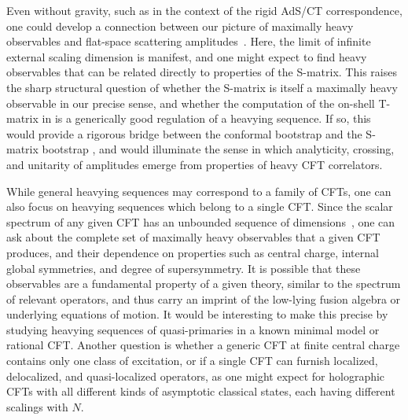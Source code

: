 \documentclass[a4paper,11pt]{article}
\theoremstyle{plain}
\theoremstyle{definition}
\theoremstyle{remark}
\begin{document}
Even without gravity, such as in the context of the rigid AdS/CT correspondence, one could develop a connection between our picture of maximally heavy observables and flat-space scattering amplitudes~\cite{vanRees:2022zmr,Paulos2016-mh,vanRees:2023fcf,Penedones:2010ue}. Here, the limit of infinite external scaling dimension is manifest, and one might expect to find heavy observables that can be related directly to properties of the S-matrix. This raises the sharp structural question of whether the S-matrix is itself a maximally heavy observable in our precise sense, and whether the computation of the on-shell T-matrix in \cite{vanRees:2022zmr} is a generically good regulation of a heavying sequence. If so, this would provide a rigorous bridge between the conformal bootstrap and the S-matrix bootstrap \cite{Paulos:2016fap,Paulos:2017fhb}, and would illuminate the sense in which analyticity, crossing, and unitarity of amplitudes emerge from properties of heavy CFT correlators.

While general heavying sequences may correspond to a family of CFTs, one can also focus on heavying sequences which belong to a single CFT. Since the scalar spectrum of any given CFT has an unbounded sequence of dimensions~\cite{Qiao:2017xif,Mukhametzhanov:2018zja}, one can ask about the complete set of maximally heavy observables that a given CFT produces, and their dependence on properties such as central charge, internal global symmetries, and degree of supersymmetry. It is possible that these observables are a fundamental property of a given theory, similar to the spectrum of relevant operators, and thus carry an imprint of the low-lying fusion algebra or underlying equations of motion. It would be interesting to make this precise by studying heavying sequences of quasi-primaries in a known minimal model or rational CFT. Another question is whether a generic CFT at finite central charge contains only one class of excitation, or if a single CFT can furnish localized, delocalized, and quasi-localized operators, as one might expect for holographic CFTs with all different kinds of asymptotic classical states, each having different scalings with $N$. 
\end{document}
